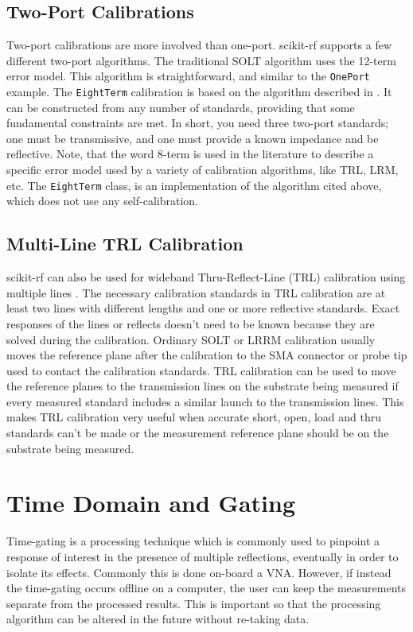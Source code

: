 \documentclass{IEEEjmw}
\begin{document}
\subsection{Two-Port Calibrations}
Two-port calibrations are more involved than one-port. scikit-rf supports a few different two-port algorithms. The traditional SOLT algorithm uses the 12-term error model. This algorithm is straightforward, and similar to the \texttt{OnePort} example. The \texttt{EightTerm} calibration is based on the algorithm described in \cite{speciale1977}. It can be constructed from any number of standards, providing that some fundamental constraints are met. In short, you need three two-port standards; one must be transmissive, and one must provide a known impedance and be reflective. Note, that the word 8-term is used in the literature to describe a specific error model used by a variety of calibration algorithms, like TRL, LRM, etc. The \texttt{EightTerm} class, is an implementation of the algorithm cited above, which does not use any self-calibration.

\subsection{Multi-Line TRL Calibration}
scikit-rf can also be used for wideband Thru-Reflect-Line (TRL) calibration using multiple lines \cite{marks1991}. The necessary calibration standards in TRL calibration are at least two lines with different lengths and one or more reflective standards. Exact responses of the lines or reflects doesn’t need to be known because they are solved during the calibration. Ordinary SOLT or LRRM calibration usually moves the reference plane after the calibration to the SMA connector or probe tip used to contact the calibration standards. TRL calibration can be used to move the reference planes to the transmission lines on the substrate being measured if every measured standard includes a similar launch to the transmission lines. This makes TRL calibration very useful when accurate short, open, load and thru standards can’t be made or the measurement reference plane should be on the substrate being measured. 

\section{Time Domain and Gating}
Time-gating is a processing technique which is commonly used to pinpoint a response of interest in the presence of multiple reflections, eventually in order to isolate its effects. Commonly this is done on-board a VNA. However, if instead the time-gating occurs offline on a computer, the user can keep the measurements separate from the processed results. This is important so that the processing algorithm can be altered in the future without re-taking data. 
\end{document}
